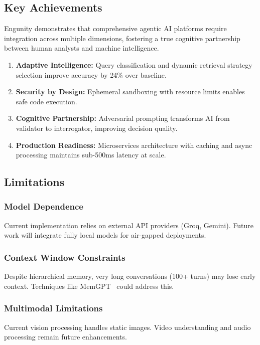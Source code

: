 \documentclass[conference]{IEEEtran}
\begin{document}
\subsection{Key Achievements}

Engunity demonstrates that comprehensive agentic AI platforms require integration across multiple dimensions, fostering a true cognitive partnership between human analysts and machine intelligence.

\begin{enumerate}
    \item \textbf{Adaptive Intelligence:} Query classification and dynamic retrieval strategy selection improve accuracy by 24\% over baseline.
    \item \textbf{Security by Design:} Ephemeral sandboxing with resource limits enables safe code execution.
    \item \textbf{Cognitive Partnership:} Adversarial prompting transforms AI from validator to interrogator, improving decision quality.
    \item \textbf{Production Readiness:} Microservices architecture with caching and async processing maintains sub-500ms latency at scale.
\end{enumerate}

\subsection{Limitations}

\subsubsection{Model Dependence}
Current implementation relies on external API providers (Groq, Gemini). Future work will integrate fully local models for air-gapped deployments.

\subsubsection{Context Window Constraints}
Despite hierarchical memory, very long conversations (100+ turns) may lose early context. Techniques like MemGPT~\cite{packer2023memgpt} could address this.

\subsubsection{Multimodal Limitations}
Current vision processing handles static images. Video understanding and audio processing remain future enhancements.
\end{document}
